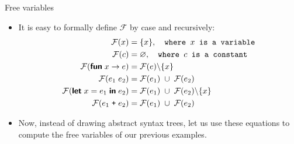 \documentclass[compress,dvipdfmx]{beamer}
\newcommand\FV[1]{\mathcal{F}({#1})}
\begin{document}
%
\begin{frame}{Free variables}

  \begin{itemize}

    \item It is easy to formally define \(\mathcal{F}\) by case and
      recursively:
      \begin{align*}
        \FV{x} &= \{x\}, \quad\texttt{where $x$ is a
          variable}\\
        \FV{c} &= \varnothing, \quad\texttt{where $c$ is a
          constant}\\
        \FV{\Xfun \; x \rightarrow e} &=
          \FV{e} \backslash \{x\}\\
          \FV{e_1 \; e_2} &= \FV{e_1} \;\cup\; \FV{e_2}\\
          \FV{\Xlet \; x  = e_1 \; \Xin \; e_2} &=
          \FV{e_1} \;\cup\; \FV{e_2} \backslash \{x\}\\
          \FV{e_1 \; \texttt{+} \; e_2} &= \FV{e_1} \;\cup\; \FV{e_2}
      \end{align*}

    \item Now, instead of drawing abstract syntax trees, let us use
      these equations to compute the free variables of our previous
      examples.

  \end{itemize}

\end{frame}
\end{document}

